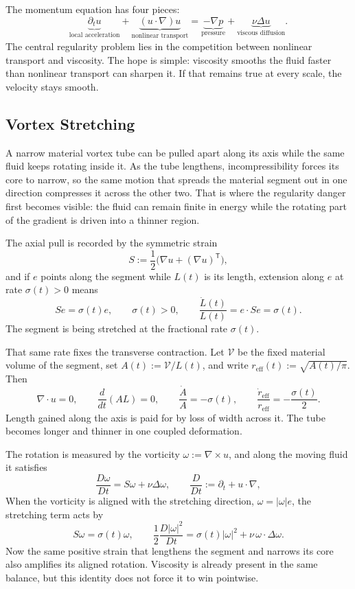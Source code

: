 
The momentum equation has four pieces:
\[
  \underbrace{\partial_t u}_{\text{local acceleration}}
  +
  \underbrace{(u\cdot\nabla)u}_{\text{nonlinear transport}}
  =
  \underbrace{-\nabla p}_{\text{pressure}}
  +
  \underbrace{\nu\Delta u}_{\text{viscous diffusion}}.
\]
The central regularity problem lies in the competition between nonlinear transport and viscosity.
The hope is simple: viscosity smooths the fluid faster than nonlinear transport can sharpen it.
If that remains true at every scale, the velocity stays smooth.

\subsection{Vortex Stretching}\label{sub:ThePerfectlyStretchingVortex}

A narrow material vortex tube can be pulled apart along its axis while the same fluid keeps rotating inside it. As the tube lengthens, incompressibility forces its core to narrow, so the same motion that spreads the material segment out in one direction compresses it across the other two. That is where the regularity danger first becomes visible: the fluid can remain finite in energy while the rotating part of the gradient is driven into a thinner region.

The axial pull is recorded by the symmetric strain
\[
  S:=\frac12\bigl(\nabla u+(\nabla u)^{\mathsf T}\bigr),
\]
and if \(e\) points along the segment while \(L(t)\) is its length, extension along \(e\) at rate \(\sigma(t)>0\) means
\[
  Se=\sigma(t)e,
  \qquad
  \sigma(t)>0,
  \qquad
  \frac{\dot L(t)}{L(t)}
  =
  e\cdot Se
  =
  \sigma(t).
\]
The segment is being stretched at the fractional rate \(\sigma(t)\).

That same rate fixes the transverse contraction. Let \(\mathcal V\) be the fixed material volume of the segment, set \(A(t):=\mathcal V/L(t)\), and write \(r_{\mathrm{eff}}(t):=\sqrt{A(t)/\pi}\). Then
\[
  \nabla\cdot u=0,
  \qquad
  \frac{d}{dt}(A L)=0,
  \qquad
  \frac{\dot A}{A}=-\sigma(t),
  \qquad
  \frac{\dot r_{\mathrm{eff}}}{r_{\mathrm{eff}}}
  =
  -\frac{\sigma(t)}{2}.
\]
Length gained along the axis is paid for by loss of width across it. The tube becomes longer and thinner in one coupled deformation.

The rotation is measured by the vorticity \(\omega:=\nabla\times u\), and along the moving fluid it satisfies
\[
  \frac{D\omega}{Dt}
  =
  S\omega+\nu\Delta\omega,
  \qquad
  \frac{D}{Dt}
  :=
  \partial_t+u\cdot\nabla,
\]
When the vorticity is aligned with the stretching direction, \(\omega=|\omega|e\), the stretching term acts by
\[
  S\omega
  =
  \sigma(t)\omega,
  \qquad
  \frac12\frac{D|\omega|^2}{Dt}
  =
  \sigma(t)|\omega|^2
  +
  \nu\,\omega\cdot\Delta\omega.
\]
Now the same positive strain that lengthens the segment and narrows its core also amplifies its aligned rotation. Viscosity is already present in the same balance, but this identity does not force it to win pointwise.


